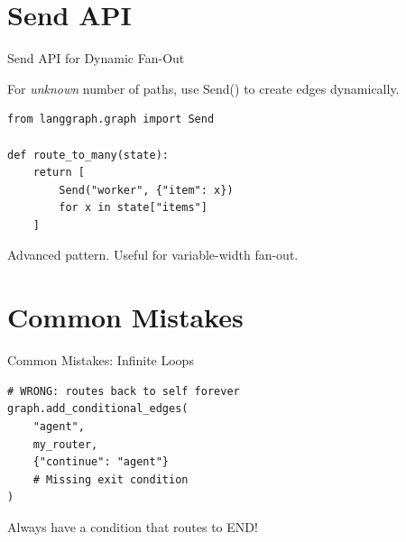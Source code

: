 \documentclass[aspectratio=169,11pt]{beamer}
\begin{document}
\section{Send API}
\begin{frame}[fragile,t]{Send API for Dynamic Fan-Out}
\vspace{0.1cm}

\begin{conceptbox}
For \textit{unknown} number of paths, use Send() to create edges dynamically.
\end{conceptbox}

\vspace{0.1cm}

\begin{codebox}
\begin{lstlisting}
from langgraph.graph import Send

def route_to_many(state):
    return [
        Send("worker", {"item": x})
        for x in state["items"]
    ]
\end{lstlisting}
\end{codebox}

\vspace{0.15cm}

{\footnotesize Advanced pattern. Useful for variable-width fan-out.}
\end{frame}

\section{Common Mistakes}
\begin{frame}[fragile,t]{Common Mistakes: Infinite Loops}
\vspace{0.1cm}

\begin{warningbox}
\begin{lstlisting}
# WRONG: routes back to self forever
graph.add_conditional_edges(
    "agent",
    my_router,
    {"continue": "agent"}
    # Missing exit condition
)
\end{lstlisting}
\end{warningbox}

\vspace{0.15cm}

\begin{tipbox}[Fix]
Always have a condition that routes to END!
\end{tipbox}
\end{frame}
\end{document}
